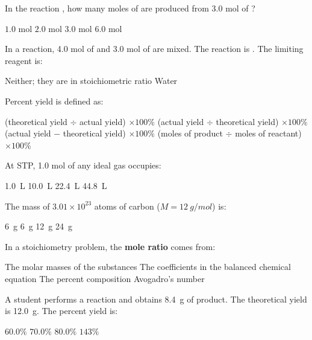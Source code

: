 \documentclass[addpoints]{exam}
\begin{document}
\begin{questions}
\question[1] In the reaction , how many moles of 
are produced from 3.0 mol of ?
\begin{choices}
    \choice $1.0$ mol
    \correctchoice $2.0$ mol
    \choice $3.0$ mol
    \choice $6.0$ mol
\end{choices}

\question[1] In a reaction, 4.0 mol of  and 3.0 mol of  are mixed.
The reaction is . The limiting reagent is:
\begin{choices}
    \choice {}
    \correctchoice {}
    \choice Neither; they are in stoichiometric ratio
    \choice Water
\end{choices}

\question[1] Percent yield is defined as:
\begin{choices}
    \choice (theoretical yield $\div$ actual yield) $\times 100\%$
    \correctchoice (actual yield $\div$ theoretical yield) $\times 100\%$
    \choice (actual yield $-$ theoretical yield) $\times 100\%$
    \choice (moles of product $\div$ moles of reactant) $\times 100\%$
\end{choices}

\question[1] At STP, 1.0 mol of any ideal gas occupies:
\begin{choices}
    \choice \SI{1.0}{L}
    \choice \SI{10.0}{L}
    \correctchoice \SI{22.4}{L}
    \choice \SI{44.8}{L}
\end{choices}

\question[1] The mass of $3.01 \times 10^{23}$ atoms of carbon ($M = \SI{12}{g/mol}$) is:
\begin{choices}
    \choice \SI{6}{g}
    \correctchoice \SI{6}{g}
    \choice \SI{12}{g}
    \choice \SI{24}{g}
\end{choices}

\question[1] In a stoichiometry problem, the \textbf{mole ratio} comes from:
\begin{choices}
    \choice The molar masses of the substances
    \correctchoice The coefficients in the balanced chemical equation
    \choice The percent composition
    \choice Avogadro's number
\end{choices}

\question[1] A student performs a reaction and obtains \SI{8.4}{g} of product. The
theoretical yield is \SI{12.0}{g}. The percent yield is:
\begin{choices}
    \choice $60.0\%$
    \correctchoice $70.0\%$
    \choice $80.0\%$
    \choice $143\%$
\end{choices}


\end{questions}
\end{document}
